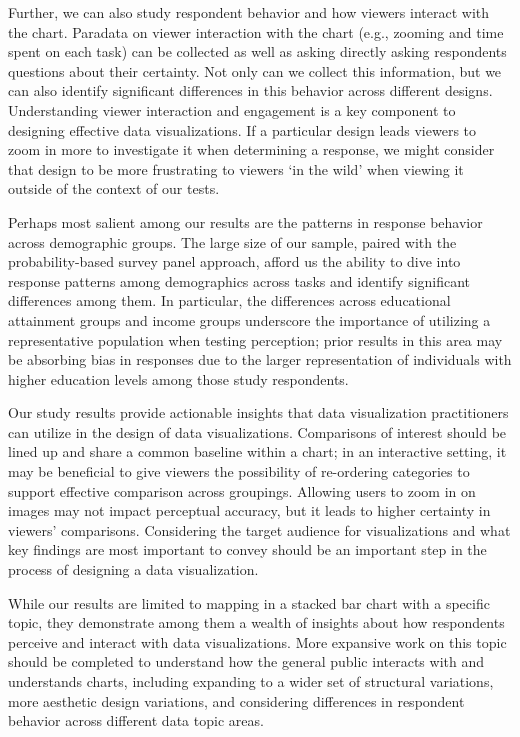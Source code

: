 \documentclass[
]{jds}
\begin{document}
Further, we can also study respondent behavior and how viewers interact
with the chart. Paradata on viewer interaction with the chart (e.g.,
zooming and time spent on each task) can be collected as well as asking
directly asking respondents questions about their certainty. Not only
can we collect this information, but we can also identify significant
differences in this behavior across different designs. Understanding
viewer interaction and engagement is a key component to designing
effective data visualizations. If a particular design leads viewers to
zoom in more to investigate it when determining a response, we might
consider that design to be more frustrating to viewers `in the wild'
when viewing it outside of the context of our tests.

Perhaps most salient among our results are the patterns in response
behavior across demographic groups. The large size of our sample, paired
with the probability-based survey panel approach, afford us the ability
to dive into response patterns among demographics across tasks and
identify significant differences among them. In particular, the
differences across educational attainment groups and income groups
underscore the importance of utilizing a representative population when
testing perception; prior results in this area may be absorbing bias in
responses due to the larger representation of individuals with higher
education levels among those study respondents.

Our study results provide actionable insights that data visualization
practitioners can utilize in the design of data visualizations.
Comparisons of interest should be lined up and share a common baseline
within a chart; in an interactive setting, it may be beneficial to give
viewers the possibility of re-ordering categories to support effective
comparison across groupings. Allowing users to zoom in on images may not
impact perceptual accuracy, but it leads to higher certainty in viewers'
comparisons. Considering the target audience for visualizations and what
key findings are most important to convey should be an important step in
the process of designing a data visualization.

While our results are limited to mapping in a stacked bar chart with a
specific topic, they demonstrate among them a wealth of insights about
how respondents perceive and interact with data visualizations. More
expansive work on this topic should be completed to understand how the
general public interacts with and understands charts, including
expanding to a wider set of structural variations, more aesthetic design
variations, and considering differences in respondent behavior across
different data topic areas.
\end{document}
